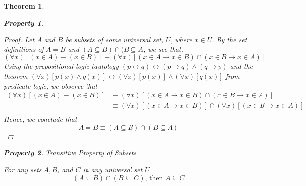 \documentclass{book}
\newtheorem{theorem}{Theorem}[section]
\newtheorem{property}{Property}[theorem]
\theoremstyle{definition}
\theoremstyle{remark}
\begin{document}
\begin{theorem}
\begin{property}
        \begin{proof}
            Let $A$ and $B$ be subsets of some universal set, $U$, where $x \in U$. By the set definitions of $A = B$ and $(A \subseteq B) \cap (B \subseteq A$, we see that, 
                \begin{equation*}
                    (\forall x)[(x \in A)\equiv (x \in B)] \equiv (\forall x)[(x \in A \to x \in B) \cap (x \in B \to x \in A)]
                \end{equation*}
            Using the propositional logic tautology $(p \leftrightarrow q) \leftrightarrow (p \to q) \wedge (q \to p)$ and the theorem $(\forall x)[p(x) \wedge q(x)] \leftrightarrow (\forall x)[p(x)] \wedge (\forall x)[q(x)]$ from predicate logic, we observe that
                \begin{align*}
                    (\forall x)[(x \in A)\equiv (x \in B)] & \equiv (\forall x)[(x \in A \to x \in B) \cap (x \in B \to x \in A)] \\
                    & \equiv (\forall x)[(x \in A \to x \in B)] \cap (\forall x)[(x \in B \to x \in A)] \\
                \end{align*}
            Hence, we conclude that $$ A = B \equiv (A \subseteq B) \cap (B \subseteq A) $$
        \end{proof}
    \end{property}
    
    
    
    \newpage
    \begin{property}
    Transitive Property of Subsets  \\
        \begin{tcolorbox}
            For any sets $A, B$, and $C$ in any universal set $U$
                \begin{equation*}
                    (A \subseteq B) \cap (B \subseteq\ C)\text{, then } A \subseteq C
                \end{equation*}
        \end{tcolorbox}
    

\end{property}
\end{theorem}
\end{document}
